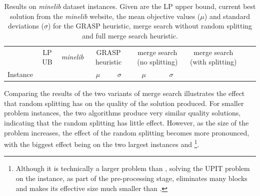 \documentclass[journal]{IEEEtran}
\begin{document}
\begin{table}[h!]
\centering
\caption[Results on \emph{minelib} dataset instances]{Results on \emph{minelib} dataset instances. Given are the LP upper bound, current best solution from the \emph{minelib} website, the mean objective values (\(\mu\)) and standard deviations (\(\sigma\)) for the GRASP heuristic, merge search without random splitting and full merge search heuristic.%
}\label{tab:mine:main}
\begin{adjustbox}{width=\textwidth}
\begin{tabular}{lrrrrrrrrrr} \toprule
 & \multicolumn{1}{c}{LP UB} & \multicolumn{1}{c}{\emph{minelib}} & \multicolumn{2}{c}{GRASP heuristic} & \multicolumn{2}{c}{merge search (no splitting)} & \multicolumn{2}{c}{merge search (with splitting)}\\
\cmidrule(lr){2-2}\cmidrule(lr){3-3} \cmidrule(lr){4-5} \cmidrule(lr){6-7} \cmidrule(lr){8-9}
Instance & & & \multicolumn{1}{c}{\(\mu\)}&\multicolumn{1}{c}{\(\sigma\)} & \multicolumn{1}{c}{\(\mu\)}&\multicolumn{1}{c}{\(\sigma\)}  \\ \midrule
%

%
\bottomrule

\end{tabular}
\end{adjustbox}
\end{table}
Comparing the results of the two variants of merge search illustrates the effect that random splitting has on the quality of the solution produced. For smaller problem instances, the two algorithms produce very similar quality solutions, indicating that the random splitting has little effect. 
However, as the size of the problem increases, the effect of the random splitting becomes more pronounced, with the biggest effect being on the two largest instances \zuckmed{} and \zucklarge{}\footnote{Although it is technically a larger problem than \zuckmed, solving the UPIT problem on the \marvin{} instance, as part of the pre-processing stage, eliminates many blocks and makes its effective size much smaller than \zuckmed.}. 
\end{document}
